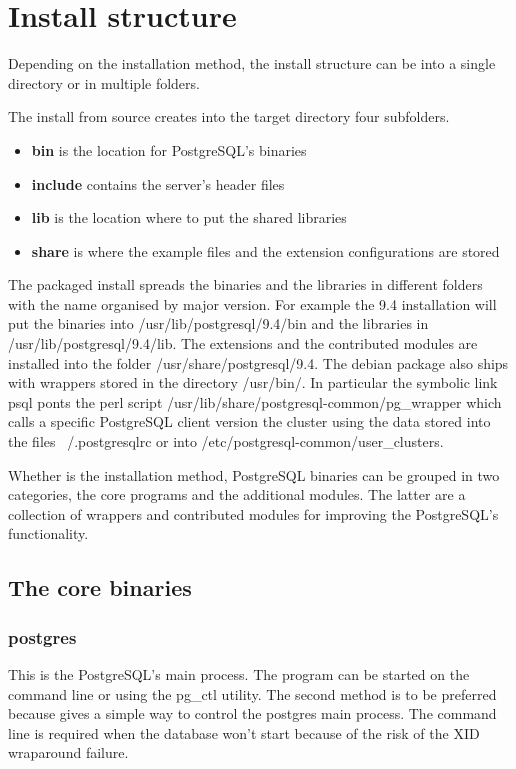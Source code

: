 \chapter{Install structure}\label{cha:INSTALLSTRUCT}
Depending on the installation method, the install structure can be into a single directory or in multiple 
folders.\newline

The install from source creates into the target directory four subfolders.

\begin{itemize}
 \item \textbf{bin} is the location for PostgreSQL's binaries
 \item \textbf{include} contains the server's header files
 \item \textbf{lib} is the location where to put the shared libraries
 \item \textbf{share} is where the example files and the extension configurations are stored
\end{itemize}


The packaged install spreads the binaries and the libraries in different folders with the name organised by 
major version. For example the 9.4 installation will put the binaries into /usr/lib/postgresql/9.4/bin and 
the libraries in /usr/lib/postgresql/9.4/lib. The extensions and the contributed modules are installed into 
the folder /usr/share/postgresql/9.4. The debian package also ships with wrappers stored in the directory 
/usr/bin/. In particular the symbolic link psql ponts the perl script \newline
/usr/lib/share/postgresql-common/pg\_wrapper which calls a specific PostgreSQL client version the cluster 
using the data stored into the files ~/.postgresqlrc or into \newline 
/etc/postgresql-common/user\_clusters.\newline

Whether is the installation method, PostgreSQL binaries can be grouped in two categories, the core 
programs and the additional modules. The latter are a collection of wrappers and contributed 
modules for improving the PostgreSQL's functionality. 

\section{The core binaries}

\subsection{postgres}
\label{sec:POSTGRES}
This is the PostgreSQL's main process. The program can be started on the command line or using the pg\_ctl 
utility. The second method is to be preferred because gives a simple way to control the postgres 
main process. The command line is required when the database won't start because of the risk of the 
XID wraparound failure. 

